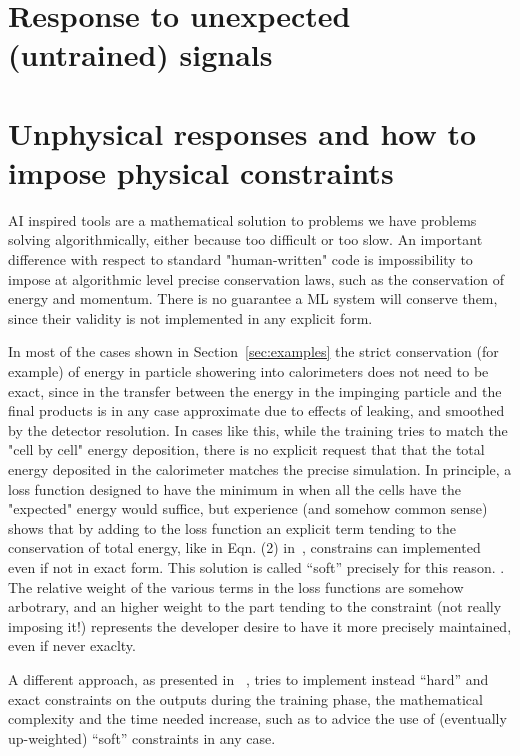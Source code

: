 \section{Response to unexpected (untrained) signals}
\section{Unphysical responses and how to impose physical constraints}
\label{subsec:physical}
AI inspired tools are a mathematical solution to problems we have problems solving algorithmically, either because too difficult or too slow.
An important difference with respect to standard "human-written" code is impossibility to impose at algorithmic level precise conservation laws, such as the conservation of energy and momentum.
There is no guarantee a ML system will conserve them, since their validity is not implemented in any explicit form.

In most of the cases shown in Section~\ref{sec:examples} the strict conservation (for example) of energy in particle showering into calorimeters does not need to be exact, since in the transfer  between the energy in the impinging particle and the final products is in any case approximate due to effects of leaking, and smoothed by the detector resolution. In cases like this, while the training tries to  match the "cell by cell" energy deposition, there is no explicit request that that the total energy deposited in the calorimeter matches the precise simulation. In principle, a loss function designed to have the minimum in when all the cells have the "expected" energy would suffice, but experience (and somehow common sense) shows that by adding to the loss function an explicit term tending to the conservation of total energy, like in Eqn. (2) in~\cite{calogan}, constrains can implemented even if not in exact form. This solution is called ``soft'' precisely for this reason. .
The relative weight of the various terms in the loss functions are somehow arbotrary, and an higher weight to the part tending to the constraint (not really imposing it!) represents the developer desire to have it more precisely maintained, even if never exaclty.

A different approach, as  presented in ~\cite{salzmann}, tries to implement instead ``hard'' and exact constraints on the outputs during the training  phase, the mathematical complexity and the time needed increase, such as to advice the use of (eventually up-weighted)  ``soft'' constraints in any case.

